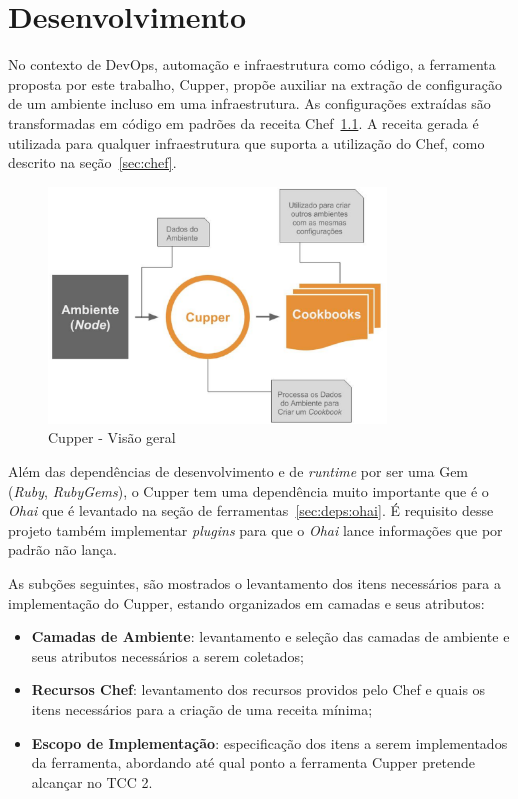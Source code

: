 \chapter{Desenvolvimento}
\label{chap:desenv}

No contexto de DevOps, automação e infraestrutura como código, a ferramenta
proposta por este trabalho, Cupper, propõe auxiliar na extração de configuração
de um ambiente incluso em uma infraestrutura. As configurações extraídas são
transformadas em código em padrões da receita Chef~\ref{fig:cupper_geral}. A
receita gerada é utilizada para qualquer infraestrutura que suporta a
utilização do Chef, como descrito na seção~\ref{sec:chef}.

\begin{figure}[h]
  \centering
  \includegraphics[width=0.8\textwidth]{figuras/cupper_geral.eps}
  \caption{Cupper - Visão geral}
  \label{fig:cupper_geral}
\end{figure}

Além das dependências de desenvolvimento e de \textit{runtime} por ser uma Gem
(\textit{Ruby}, \textit{RubyGems}), o Cupper tem uma dependência muito
importante que é o \textit{Ohai} que é levantado na seção de 
ferramentas~\ref{sec:deps:ohai}. É requisito desse projeto também implementar
\textit{plugins} para que o \textit{Ohai} lance informações que por padrão 
não lança.

As subções seguintes, são mostrados o levantamento dos itens necessários para
a implementação do Cupper, estando organizados em camadas e seus atributos:

\begin{itemize}
  \item \textbf{Camadas de Ambiente}: levantamento e seleção das camadas de ambiente
    e seus atributos necessários a serem coletados;
  \item \textbf{Recursos Chef}: levantamento dos recursos providos pelo Chef e quais os
    itens necessários para a criação de uma receita mínima;
  \item \textbf{Escopo de Implementação}: especificação dos itens a serem implementados
    da ferramenta, abordando até qual ponto a ferramenta Cupper pretende alcançar
    no TCC 2.
\end{itemize}




